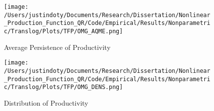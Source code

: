 \documentclass{article}
\begin{document}
\begin{figure}[H]
\centering
\caption{Average Persistence of Productivity}
\texttt{[image: /Users/justindoty/Documents/Research/Dissertation/Nonlinear\_Production\_Function\_QR/Code/Empirical/Results/Nonparametric/Translog/Plots/TFP/OMG\_AQME.png]}
\label{waqme}
\end{figure} 

\begin{figure}[H]
\centering
\caption{Distribution of Productivity}
\texttt{[image: /Users/justindoty/Documents/Research/Dissertation/Nonlinear\_Production\_Function\_QR/Code/Empirical/Results/Nonparametric/Translog/Plots/TFP/OMG\_DENS.png]}
\label{omgdens}
\end{figure} 





\pagebreak
\newpage



\pagebreak
\newpage

\appendix

                                          
\end{document}
